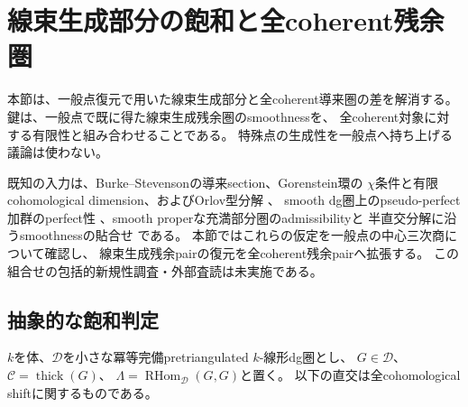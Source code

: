 \section{線束生成部分の飽和と全coherent残余圏}
\label{crs:sec:saturation}

本節は、一般点復元で用いた線束生成部分と全coherent導来圏の差を解消する。
鍵は、一般点で既に得た線束生成残余圏のsmoothnessを、
全coherent対象に対する有限性と組み合わせることである。
特殊点の生成性を一般点へ持ち上げる議論は使わない。

既知の入力は、Burke--Stevensonの導来section、Gorenstein環の
$\chi$条件と有限cohomological dimension、およびOrlov型分解
\cite[Proposition~4.18, Lemmas~6.1--6.2, Theorem~6.4]{LP-BS}、
smooth dg圏上のpseudo-perfect加群のperfect性
\cite[Lemma~2.8(2)]{ROGTV}、smooth properな充満部分圏のadmissibilityと
半直交分解に沿うsmoothnessの貼合せ
\cite[Lemmas~4.13, 4.15(3)]{CRSPerry}である。
本節ではこれらの仮定を一般点の中心三次商について確認し、
線束生成残余pairの復元を全coherent残余pairへ拡張する。
この組合せの包括的新規性調査・外部査読は未実施である。

\subsection{抽象的な飽和判定}

$k$を体、$\mathcal D$を小さな冪等完備pretriangulated $k$-線形dg圏とし、
$G\in\mathcal D$、$\mathcal C=\operatorname{thick}(G)$、
$\Lambda=\operatorname{RHom}_{\mathcal D}(G,G)$と置く。
以下の直交は全cohomological shiftに関するものである。

